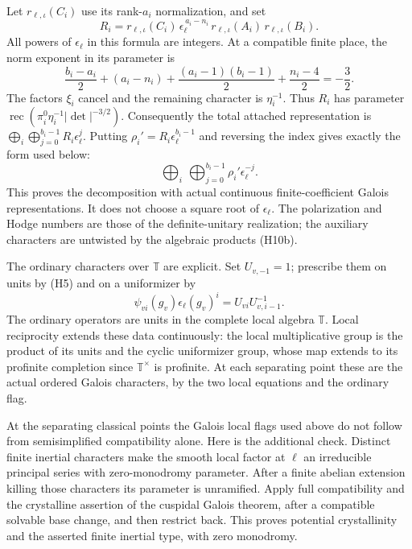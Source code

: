 Let \(r_{\ell,\iota}(C_i)\) use its rank-\(a_i\)
normalization, and set
\[
 R_i=r_{\ell,\iota}(C_i)\,
            \epsilon_\ell^{\,a_i-n_i}\,
            r_{\ell,\iota}(A_i)\,
            r_{\ell,\iota}(B_i).
 \tag{H10c}
\]
All powers of \(\epsilon_\ell\) in this formula are integers.
At a compatible finite place, the norm exponent in its
parameter is
\[
 \frac{b_i-a_i}{2}+(a_i-n_i)
       +\frac{(a_i-1)(b_i-1)}{2}
       +\frac{n_i-4}{2}=-\frac32 .
\]
The factors \(\xi_i\) cancel and the remaining character
is \(\eta_i^{-1}\).
Thus \(R_i\) has parameter
\(\operatorname{rec}(\pi_i^0\eta_i^{-1}|\det|^{-3/2})\).
Consequently the total attached representation is
\(\bigoplus_i\bigoplus_{j=0}^{b_i-1}R_i\epsilon_\ell^j\).
Putting \(\rho_i'=R_i\epsilon_\ell^{b_i-1}\) and reversing
the index gives exactly the form used below:
\[
             \bigoplus_i\ \bigoplus_{j=0}^{b_i-1}
                                  \rho_i'\epsilon_\ell^{-j}.
 \tag{H10}
\]
This proves the decomposition with actual continuous
finite-coefficient Galois representations.
It does not choose a square root of \(\epsilon_\ell\).
The polarization and Hodge numbers are those of the
definite-unitary realization; the auxiliary characters
are untwisted by the algebraic products (H10b).

The ordinary characters over \(\mathbb T\) are explicit.
Set \(U_{v,-1}=1\); prescribe them on units by (H5)
and on a uniformizer by
\[
        \psi_{vi}(g_v)\epsilon_\ell(g_v)^i
                                  =U_{vi}U_{v,i-1}^{-1}.
 \tag{H11}
\]
The ordinary operators are units in the complete local
algebra \(\mathbb T\).
Local reciprocity extends these data continuously:
the local multiplicative group is the product of its
units and the cyclic uniformizer group, whose map
extends to its profinite completion since
\(\mathbb T^\times\) is profinite.
At each separating point these are the actual ordered
Galois characters, by the two local equations and the
ordinary flag.

At the separating classical points the Galois local flags
used above do not follow from semisimplified compatibility
alone. Here is the additional check.
Distinct finite inertial characters make the smooth local
factor at \(\ell\) an irreducible principal series with
zero-monodromy parameter.
After a finite abelian extension killing those characters
its parameter is unramified.
Apply full compatibility and the crystalline assertion of
the cuspidal Galois theorem, after a compatible solvable
base change, and then restrict back.
This proves potential crystallinity and the asserted
finite inertial type, with zero monodromy.


